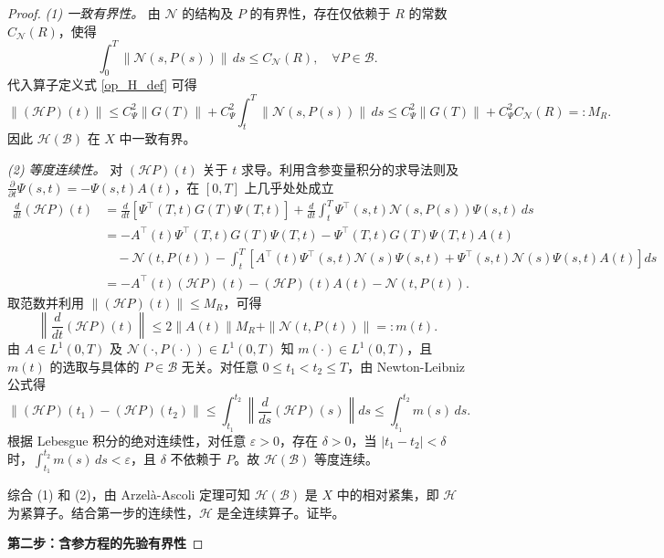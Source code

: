 \documentclass{GZUbachelorthesis}
\begin{document}
\begin{proof}
	\textit{(1) 一致有界性。} 由 $\mathcal{N}$ 的结构及 $P$ 的有界性，存在仅依赖于 $R$ 的常数 $C_{\mathcal{N}}(R)$，使得
	\[
	\int_0^T \|\mathcal{N}(s, P(s))\| \, ds \le C_{\mathcal{N}}(R), \quad \forall P \in \mathcal{B}.
	\]
	代入算子定义式 \eqref{op_H_def} 可得
	\[
	\|(\mathcal{H}P)(t)\| \le C_\Psi^2 \|G(T)\| + C_\Psi^2 \int_t^T \|\mathcal{N}(s, P(s))\| \, ds \le C_\Psi^2 \|G(T)\| + C_\Psi^2 C_{\mathcal{N}}(R) =: M_R.
	\]
	因此 $\mathcal{H}(\mathcal{B})$ 在 $X$ 中一致有界。
	
	\textit{(2) 等度连续性。} 对 $(\mathcal{H}P)(t)$ 关于 $t$ 求导。利用含参变量积分的求导法则及 $\frac{\partial}{\partial t}\Psi(s,t) = -\Psi(s,t)A(t)$，在 $[0,T]$ 上几乎处处成立
	\begin{align*}
		\frac{d}{dt}(\mathcal{H}P)(t) 
		&= \frac{d}{dt}\left[\Psi^\top(T,t)G(T)\Psi(T,t)\right] + \frac{d}{dt}\int_t^T \Psi^\top(s,t)\mathcal{N}(s, P(s))\Psi(s,t)\,ds \\
		&= -A^\top(t)\Psi^\top(T,t)G(T)\Psi(T,t) - \Psi^\top(T,t)G(T)\Psi(T,t)A(t) \\
		&\quad - \mathcal{N}(t, P(t)) - \int_t^T \left[ A^\top(t)\Psi^\top(s,t)\mathcal{N}(s)\Psi(s,t) + \Psi^\top(s,t)\mathcal{N}(s)\Psi(s,t)A(t) \right] ds \\
		&= -A^\top(t)(\mathcal{H}P)(t) - (\mathcal{H}P)(t)A(t) - \mathcal{N}(t, P(t)).
	\end{align*}
	取范数并利用 $\|(\mathcal{H}P)(t)\| \le M_R$，可得
	\[
	\left\|\frac{d}{dt}(\mathcal{H}P)(t)\right\| \le 2\|A(t)\| M_R + \|\mathcal{N}(t, P(t))\| =: m(t).
	\]
	由 $A \in L^1(0,T)$ 及 $\mathcal{N}(\cdot, P(\cdot)) \in L^1(0,T)$ 知 $m(\cdot) \in L^1(0,T)$，且 $m(t)$ 的选取与具体的 $P \in \mathcal{B}$ 无关。对任意 $0 \le t_1 < t_2 \le T$，由 Newton-Leibniz 公式得
	\[
	\|(\mathcal{H}P)(t_1) - (\mathcal{H}P)(t_2)\| \le \int_{t_1}^{t_2} \left\|\frac{d}{ds}(\mathcal{H}P)(s)\right\| ds \le \int_{t_1}^{t_2} m(s) \, ds.
	\]
	根据 Lebesgue 积分的绝对连续性，对任意 $\varepsilon > 0$，存在 $\delta > 0$，当 $|t_1 - t_2| < \delta$ 时，$\int_{t_1}^{t_2} m(s) \, ds < \varepsilon$，且 $\delta$ 不依赖于 $P$。故 $\mathcal{H}(\mathcal{B})$ 等度连续。
	
	综合 (1) 和 (2)，由 Arzelà-Ascoli 定理可知 $\mathcal{H}(\mathcal{B})$ 是 $X$ 中的相对紧集，即 $\mathcal{H}$ 为紧算子。结合第一步的连续性，$\mathcal{H}$ 是全连续算子。证毕。
	
	\textbf{第二步：含参方程的先验有界性}
	

\end{proof}
\end{document}
